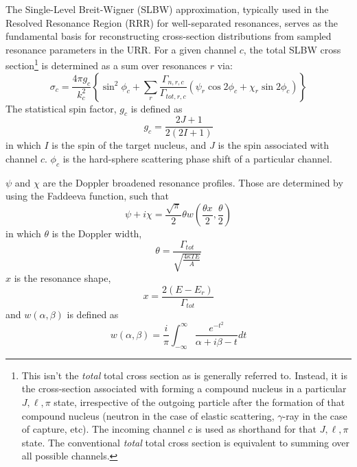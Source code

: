 The Single-Level Breit-Wigner (SLBW) approximation\cite{t2}, typically used in the Resolved Resonance Region (RRR) for well-separated resonances, serves as the fundamental basis for reconstructing cross-section distributions from sampled resonance parameters in the URR. For a given channel $c$, the total SLBW cross section\footnote{This isn't the \textit{total} total cross section as is generally referred to. Instead, it is the cross-section associated with forming a compound nucleus in a particular $J,\ell,\pi$ state, irrespective of the outgoing particle after the formation of that compound nucleus (neutron in the case of elastic scattering, $\gamma$-ray in the case of capture, etc). The incoming channel $c$ is used as shorthand for that $J,\ell,\pi$ state. The conventional \textit{total} total cross section is equivalent to summing over all possible channels.} is determined as a sum over resonances $r$ via:
\begin{equation}
    \label{eq:slbw}
    \sigma_c = \frac{ 4 \pi g_c}{k_c^2} 
        \left\{ \sin^2{\phi_c} + \sum_r \frac{\Gamma_{n,r,c}}{\Gamma_{tot,r,c}}
            \left( \psi_r \cos{2 \phi_{c}} + \chi_r \sin{2\phi_c}
            \right)
        \right\}
\end{equation}
The statistical spin factor, $g_c$ is defined as
\begin{equation}
    g_c = \frac{2J + 1}{2(2I + 1)}
\end{equation}
in which $I$ is the spin of the target nucleus, and $J$ is the spin associated with channel $c$. $\phi_c$ is the hard-sphere scattering phase shift of a particular channel.

$\psi$ and $\chi$ are the Doppler broadened resonance profiles. Those are determined by using the Faddeeva function\cite{algo-916}, such that
\begin{equation}
    \label{eq:faddeeva}
    \psi + i\chi = \frac{\sqrt{\pi}}{2}\theta w \left(\frac{\theta x}{2}, \frac{\theta}{2} \right)
\end{equation}
in which $\theta$ is the Doppler width,
\begin{equation}
    \theta = \frac{\Gamma_{tot}}{\sqrt{\frac{4 \kappa T E}{A}}}
    \label{eq:doppler-width}
\end{equation}
$x$ is the resonance shape,
\begin{equation}
    x = \frac{2 (E - E_r)}{\Gamma_{tot}}
\end{equation}
and $w(\alpha,\beta)$ is defined as
\begin{equation}
    w(\alpha,\beta) = \frac{i}{\pi} \int_{-\infty}^{\infty} \frac{e^{-t^2}}{\alpha + i\beta - t}dt
\end{equation}

